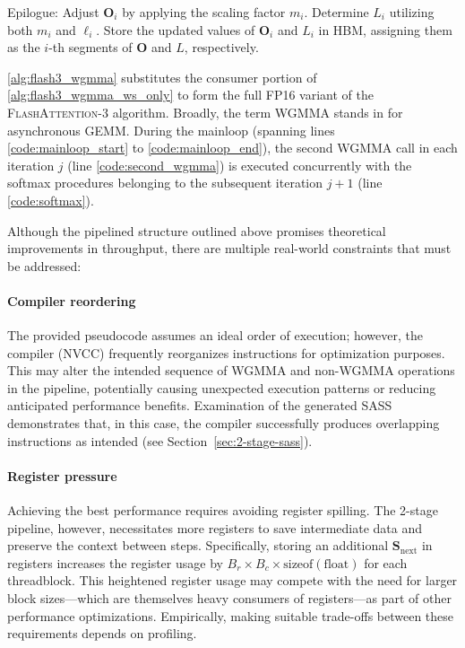 \begin{enumerate}
\begin{algorithm}[H]
\begin{algorithmic}[1]
\STATE Epilogue: Adjust $\mathbf{O}_{i}$ by applying the scaling factor $m_{i}$. Determine $L_{i}$ utilizing both $m_{i}$ and $\ell_{i}$.  
Store the updated values of $\mathbf{O}_{i}$ and $L_{i}$ in HBM, assigning them as the $i$-th segments of $\mathbf{O}$ and $L$, respectively.  
\end{algorithmic}
\end{algorithm}

\cref{alg:flash3_wgmma} substitutes the consumer portion of \cref{alg:flash3_wgmma_ws_only} to form the full FP16 variant of the \textsc{FlashAttention-3} algorithm. Broadly, the term WGMMA stands in for asynchronous GEMM. During the mainloop (spanning lines \ref{code:mainloop_start} to \ref{code:mainloop_end}), the second WGMMA call in each iteration $j$ (line \ref{code:second_wgmma}) is executed concurrently with the softmax procedures belonging to the subsequent iteration $j+1$ (line \ref{code:softmax}).

Although the pipelined structure outlined above promises theoretical improvements in throughput, there are multiple real-world constraints that must be addressed:

\paragraph{Compiler reordering} The provided pseudocode assumes an ideal order of execution; however, the compiler (NVCC) frequently reorganizes instructions for optimization purposes. This may alter the intended sequence of WGMMA and non-WGMMA operations in the pipeline, potentially causing unexpected execution patterns or reducing anticipated performance benefits. Examination of the generated SASS demonstrates that, in this case, the compiler successfully produces overlapping instructions as intended (see Section~\ref{sec:2-stage-sass}).

\paragraph{Register pressure} Achieving the best performance requires avoiding register spilling. The 2-stage pipeline, however, necessitates more registers to save intermediate data and preserve the context between steps. Specifically, storing an additional $\mathbf{S}_{\mathrm{next}}$ in registers increases the register usage by $B_r \times B_c \times \text{sizeof}(\text{float})$ for each threadblock. This heightened register usage may compete with the need for larger block sizes—which are themselves heavy consumers of registers—as part of other performance optimizations. Empirically, making suitable trade-offs between these requirements depends on profiling.


\end{enumerate}
